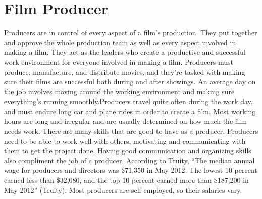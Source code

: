 \chapter{Film Producer}

Producers are in control of every aspect of a film's production. They put together and approve the whole production team as well as every aspect involved in making a film. They act as the leaders who create a productive and successful work environment for everyone involved in making a film. Producers must produce, manufacture, and distribute movies, and they’re tasked with making sure their films are successful both during and after showings. An average day on the job involves moving around the working environment and making sure everything's running smoothly.Producers travel quite often during the work day, and must endure long car and plane rides in order to create a film. Most working hours are long and irregular and are usually determined on how much the film needs work. There are many skills that are good to have as a producer. Producers need to be able to work well with others, motivating and communicating with them to get the project done. Having good communication and organizing skills also compliment the job of a producer. According to Truity, “The median annual wage for producers and directors was \$71,350 in May 2012. The lowest 10 percent earned less than \$32,080, and the top 10 percent earned more than \$187,200 in May 2012” (Truity). Most producers are self employed, so their salaries vary.


